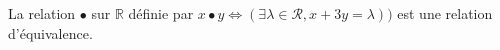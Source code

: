 La relation $\bullet$ sur $\mathbb R$ définie par $x\bullet y \iff (\exists \lambda\in\mathcal R, x+3y=\lambda))$ est une relation d'équivalence.

\begin{reponses}
\end{reponses}

